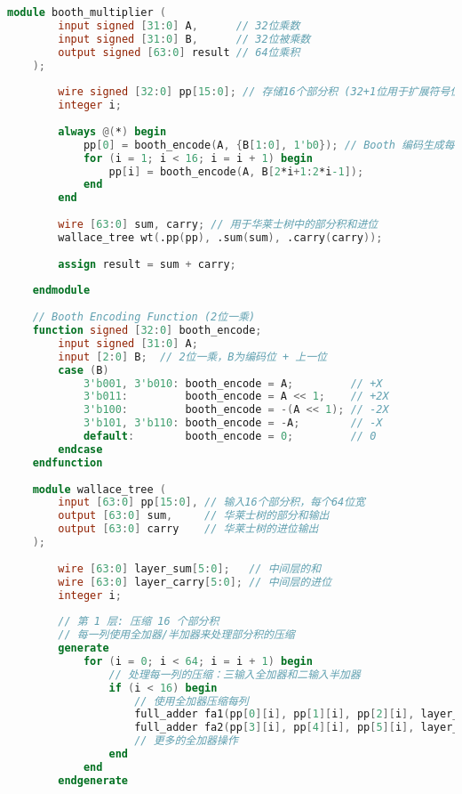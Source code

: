 \documentclass[UTF8]{report}
\begin{document}
\begin{lstlisting}[language=Verilog]
    module booth_multiplier (
        input signed [31:0] A,      // 32位乘数
        input signed [31:0] B,      // 32位被乘数
        output signed [63:0] result // 64位乘积
    );
    
        wire signed [32:0] pp[15:0]; // 存储16个部分积 (32+1位用于扩展符号位)
        integer i;
    
        always @(*) begin
            pp[0] = booth_encode(A, {B[1:0], 1'b0}); // Booth 编码生成每一组的部分积
            for (i = 1; i < 16; i = i + 1) begin
                pp[i] = booth_encode(A, B[2*i+1:2*i-1]);
            end
        end
    
        wire [63:0] sum, carry; // 用于华莱士树中的部分积和进位
        wallace_tree wt(.pp(pp), .sum(sum), .carry(carry));
    
        assign result = sum + carry;
    
    endmodule
    
    // Booth Encoding Function (2位一乘)
    function signed [32:0] booth_encode;
        input signed [31:0] A;
        input [2:0] B;  // 2位一乘，B为编码位 + 上一位
        case (B)
            3'b001, 3'b010: booth_encode = A;         // +X
            3'b011:         booth_encode = A << 1;    // +2X
            3'b100:         booth_encode = -(A << 1); // -2X
            3'b101, 3'b110: booth_encode = -A;        // -X
            default:        booth_encode = 0;         // 0
        endcase
    endfunction
    
    module wallace_tree (
        input [63:0] pp[15:0], // 输入16个部分积，每个64位宽
        output [63:0] sum,     // 华莱士树的部分和输出
        output [63:0] carry    // 华莱士树的进位输出
    );
    
        wire [63:0] layer_sum[5:0];   // 中间层的和
        wire [63:0] layer_carry[5:0]; // 中间层的进位
        integer i;
    
        // 第 1 层: 压缩 16 个部分积
        // 每一列使用全加器/半加器来处理部分积的压缩
        generate
            for (i = 0; i < 64; i = i + 1) begin
                // 处理每一列的压缩：三输入全加器和二输入半加器
                if (i < 16) begin
                    // 使用全加器压缩每列
                    full_adder fa1(pp[0][i], pp[1][i], pp[2][i], layer_sum[0][i], layer_carry[0][i]);
                    full_adder fa2(pp[3][i], pp[4][i], pp[5][i], layer_sum[1][i], layer_carry[1][i]);
                    // 更多的全加器操作
                end
            end
        endgenerate
    

\end{lstlisting}
\end{document}
